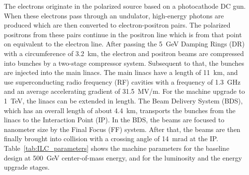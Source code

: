 The electrons originate in the polarized source based on a photocathode DC gun.
When these electrons pass through an undulator, high-energy photons are produced which are then converted to electron-positron pairs.
The polarized positrons from these pairs continue in the positron line which is from that point on equivalent to the electron line.
After passing the \SI{5}{\GeV} Damping Rings (DR) with a circumference of \SI{3.2}{\kilo\meter}, the electron and positron beams are compressed into bunches by a two-stage compressor system.
Subsequent to that, the bunches are injected into the main linacs.
The main linacs have a length of \SI{11}{\kilo\meter}, and use superconducting radio frequency (RF) cavities with a frequency of \SI{1.3}{\giga\hertz} and an average accelerating gradient of \SI{31.5}{MV/m}.
For the machine upgrade to \SI{1}{\TeV}, the linacs can be extended in length.
The Beam Delivery System (BDS), which has an overall length of about \SI{4.4}{\kilo\meter}, transports the bunches from the linacs to the Interaction Point (IP).
In the BDS, the beams are focused to nanometer size by the Final Focus (FF) system.
After that, the beams are then finally brought into collision with a crossing angle of \SI{14}{mrad} at the IP.\cite[p. 9-10]{TDR1}
Table~\ref{tab:ILC_parameters} shows the machine parameters for the baseline design at \SI{500}{\GeV} center-of-mass energy, and for the luminosity and the energy upgrade stages.



